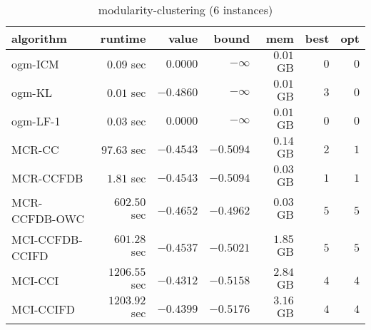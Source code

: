 \begin{table}[H]
\scriptsize
\centering
\caption{modularity-clustering (6 instances)}
\label{tab:smalltable-modularity-clustering}
\begin{tabular}{lrrrrrr}
\toprule
           algorithm &       runtime     &         value &         bound &           mem &     best &      opt   \\ \midrule 
             ogm-ICM & $         0.09$ sec & $       0.0000$ & $-\infty$ & $         0.01$ GB & $       0$ & $       0$ \\ 
              ogm-KL & $         0.01$ sec & $      -0.4860$ & $-\infty$ & $         0.01$ GB & $       3$ & $       0$ \\ 
            ogm-LF-1 & $         0.03$ sec & $       0.0000$ & $-\infty$ & $         0.01$ GB & $       0$ & $       0$ \\ 
\cmidrule{1-1} 
              MCR-CC & $        97.63$ sec & $      -0.4543$ & $      -0.5094$ & $         0.14$ GB & $       2$ & $       1$ \\ 
           MCR-CCFDB & $         1.81$ sec & $      -0.4543$ & $      -0.5094$ & $         0.03$ GB & $       1$ & $       1$ \\ 
       MCR-CCFDB-OWC & $       602.50$ sec & $      -0.4652$ & $      -0.4962$ & $         0.03$ GB & $       5$ & $       5$ \\ 
\cmidrule{1-1} 
     MCI-CCFDB-CCIFD & $       601.28$ sec & $      -0.4537$ & $      -0.5021$ & $         1.85$ GB & $       5$ & $       5$ \\ 
             MCI-CCI & $      1206.55$ sec & $      -0.4312$ & $      -0.5158$ & $         2.84$ GB & $       4$ & $       4$ \\ 
           MCI-CCIFD & $      1203.92$ sec & $      -0.4399$ & $      -0.5176$ & $         3.16$ GB & $       4$ & $       4$ \\ 
\bottomrule
\end{tabular}
\end{table}